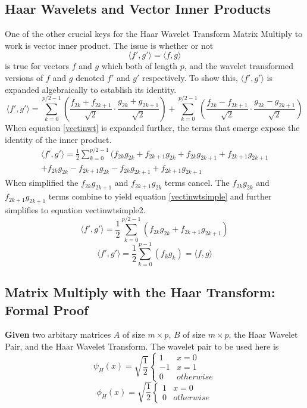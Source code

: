 \subsection {Haar Wavelets and Vector Inner Products}
One of the other crucial keys for the Haar Wavelet Transform Matrix Multiply to work is vector inner product.  The issue is whether or not 
\begin{equation}
\langle f', g' \rangle = \langle f,g \rangle 
\end{equation}
is true for vectors $f$ and $g$ which both of length $p$, and the wavelet transformed versions of $f$ and $g$ denoted $f'$ and $g'$ respectively.
To show this, $\langle f',g' \rangle$ is expanded algebraically to establish its identity.  
\begin{equation}
\label {vectinwt}
\langle f',g' \rangle = \sum \limits_{k=0} ^{p/2 -1}(\frac{f_{2k} +f_{2k+1}}{\sqrt{2}} \cdot \frac{g_{2k} + g_{2k+1}}{\sqrt{2}}) + \sum \limits_{k=0} ^{p/2 -1}(\frac{f_{2k} - f_{2k+1}}{\sqrt{2}} \cdot \frac{g_{2k} - g_{2k+1}}{\sqrt{2}})
\end{equation}
When equation \ref{vectinwt} is expanded further, the terms that emerge expose the identity of the inner product.  
\begin{eqnarray}
\label {vectinwte}
\langle f',g' \rangle = \frac{1}{2}  \sum \limits_{k=0} ^{p/2 -1}
( f_{2k} g_{2k} + f_{2k+1}g_{2k} + f_{2k}g_{2k+1} + f_{2k+1}g_{2k+1}  \\ \nonumber+  f_{2k} g_{2k} - f_{2k+1}g_{2k} - f_{2k}g_{2k+1} + f_{2k+1}g_{2k+1} 
\end{eqnarray}
When simplified the $f_{2k}g_{2k+1}$ and $f_{2k+1}g_{2k}$ terms cancel.  The $f_{2k}g_{2k}$ and $f_{2k+1}g_{2k+1}$ terms combine to yield equation \ref{vectinwtsimple} and further simplifies to equation {vectinwtsimple2}.
\begin{equation}
\label {vectinwtsimple}
\langle f',g' \rangle = \frac{1}{2}  \sum \limits_{k=0} ^{p/2 -1} (f_{2k}g_{2k} + f_{2k+1}g_{2k+1})
\end{equation}
\begin{equation}
\label {vectinwtsimple2}
\langle f',g' \rangle = \frac{1}{2}  \sum \limits_{k=0} ^{p-1} (f_{k}g_{k} ) = \langle f,g \rangle
\end{equation}


\subsection{Matrix Multiply with the Haar Transform: Formal Proof}
\textbf{Given} two arbitary matrices $A$ of size $m\times p$, $B$ of size $m\times p$, the Haar Wavelet Pair, and the Haar Wavelet Transform.  The wavelet pair to be used here is 
\[ \psi_H (x)= \sqrt{\frac{1}{2}} \left\{\begin{array}{cc}1 & x=0 \\-1 & x=1 \\0 & otherwise\end{array}\right.\]
\[\phi_H (x) = \sqrt{\frac{1}{2}} \left\{\begin{array}{cc}1 & x=0 \\0 & otherwise\end{array}\right. \]  
%

